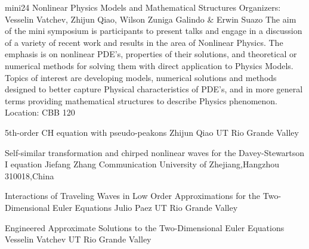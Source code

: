 \mini
{mini24}
{Nonlinear Physics Models and Mathematical Structures}
{Organizers: Vesselin Vatchev, Zhijun Qiao, Wilson Zuniga Galindo \& Erwin Suazo}
{The aim of the mini symposium is participants to present talks and engage in a discussion of a variety of recent work and results in the area of Nonlinear Physics. The emphasis is on nonlinear PDE’s, properties of their solutions, and theoretical or numerical methods for solving them with direct application to Physics Models. Topics of interest are developing models, numerical solutions and methods designed to better capture Physical characteristics of PDE’s, and in more general terms providing mathematical structures to describe Physics phenomenon.}
{Location: CBB 120}

\begin{talks}
\item\talk
{5th-order CH equation with pseudo-peakons}
{Zhijun Qiao }
{UT Rio Grande Valley}
\item\talk
{Self-similar transformation and chirped nonlinear waves for the Davey-Stewartson I equation}
{Jiefang Zhang}
{Communication University of Zhejiang,Hangzhou 310018,China}
\item\talk
{Interactions of Traveling Waves in Low Order Approximations
for the Two-Dimensional Euler Equations
}
{Julio Paez}
{UT Rio Grande Valley}
\item\talk
{Engineered Approximate Solutions to the Two-Dimensional Euler Equations}
{Vesselin Vatchev}
{UT Rio Grande Valley}
\end{talks}
\room
